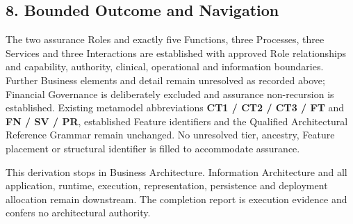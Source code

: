 \label{rad:assurance:265}



\label{rad:assurance:267}
\subsection*{8. Bounded Outcome and Navigation}
\label{rad:assurance:269}

The two assurance Roles and exactly five Functions, three Processes, three Services and three Interactions are established with approved Role relationships and capability, authority, clinical, operational and information boundaries. Further Business elements and detail remain unresolved as recorded above; Financial Governance is deliberately excluded and assurance non-recursion is established. Existing metamodel abbreviations \textbf{CT1 /\allowbreak{} CT2 /\allowbreak{} CT3 /\allowbreak{} FT} and \textbf{FN /\allowbreak{} SV /\allowbreak{} PR}, established Feature identifiers and the Qualified Architectural Reference Grammar remain unchanged. No unresolved tier, ancestry, Feature placement or structural identifier is filled to accommodate assurance.

\label{rad:assurance:271}

This derivation stops in Business Architecture. Information Architecture and all application, runtime, execution, representation, persistence and deployment allocation remain downstream. The completion report is execution evidence and confers no architectural authority.

\label{rad:assurance:273}

